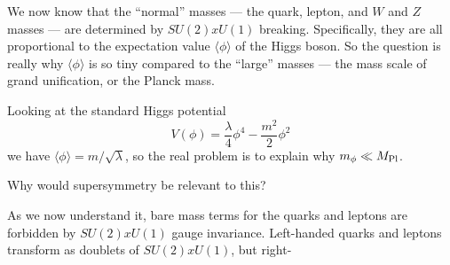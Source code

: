 We now know that the ``normal'' masses --- the quark, lepton, and
$W$ and $Z$ masses --- are determined by $SU(2) x U(1)$ breaking. Specifically,
they are all proportional to the expectation value $\langle \phi \rangle$ of the
Higgs boson. So the question is really why $\langle \phi \rangle$ is so tiny compared
to the ``large'' masses --- the mass scale of grand unification, or the
Planck mass.

Looking at the standard Higgs potential
\begin{equation}
V(\phi) = \frac{\lambda}{4}\phi^4 - \frac{m^2}{2}\phi^2
\tag{18}
\end{equation}
we have $\langle \phi \rangle = m/\sqrt{\lambda}$, so the real problem is to explain why $m_\phi \ll M_{\rm Pl}$.

Why would supersymmetry be relevant to this?

As we now understand it, bare mass terms for the quarks and
leptons are forbidden by $SU(2) x U(1)$ gauge invariance. Left-handed
quarks and leptons transform as doublets of $SU(2) x U(1)$, but right-

